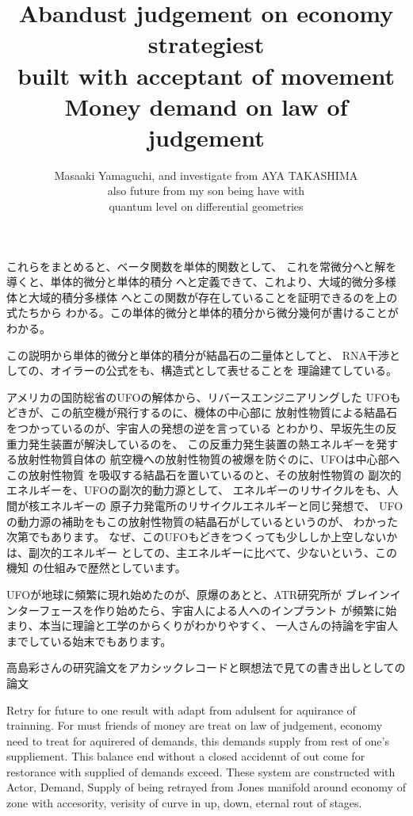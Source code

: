 \documentclass{jsarticle}
\begin{document}
{   これらをまとめると、ベータ関数を単体的関数として、
   これを常微分へと解を導くと、単体的微分と単体的積分
   へと定義できて、これより、大域的微分多様体と大域的積分多様体
   へとこの関数が存在していることを証明できるのを上の式たちから
   わかる。この単体的微分と単体的積分から微分幾何が書けることがわかる。

   この説明から単体的微分と単体的積分が結晶石の二量体としてと、
   RNA干渉としての、オイラーの公式をも、構造式として表せることを
   理論建てしている。

   アメリカの国防総省のUFOの解体から、リバースエンジニアリングした
   UFOもどきが、この航空機が飛行するのに、機体の中心部に
   放射性物質による結晶石をつかっているのが、宇宙人の発想の逆を言っている
   とわかり、早坂先生の反重力発生装置が解決しているのを、
   この反重力発生装置の熱エネルギーを発する放射性物質自体の
   航空機への放射性物質の被爆を防ぐのに、UFOは中心部へこの放射性物質
   を吸収する結晶石を置いているのと、その放射性物質の
   副次的エネルギーを、UFOの副次的動力源として、
   エネルギーのリサイクルをも、人間が核エネルギーの
   原子力発電所のリサイクルエネルギーと同じ発想で、
   UFOの動力源の補助をもこの放射性物質の結晶石がしているというのが、
   わかった次第でもあります。
   なぜ、このUFOもどきをつくっても少ししか上空しないかは、副次的エネルギー
   としての、主エネルギーに比べて、少ないという、この機知
   の仕組みで歴然としています。

   UFOが地球に頻繁に現れ始めたのが、原爆のあとと、ATR研究所が
   ブレインインターフェースを作り始めたら、宇宙人による人へのインプラント
   が頻繁に始まり、本当に理論と工学のからくりがわかりやすく、
   一人さんの持論を宇宙人までしている始末でもあります。

\title{Abandust judgement on economy strategiest \\
built with acceptant of movement \\
Money demand on law of judgement}
\author{Masaaki Yamaguchi, and investigate from AYA TAKASHIMA \\
also future from my son being have with \\
quantum level on differential geometries}

高島彩さんの研究論文をアカシックレコードと瞑想法で見ての書き出しとしての
論文

   Retry for future to one result with adapt from adulsent for
aquirance of trainning. For must friends of money are treat on
law of judgement, economy need to treat for aquirered of demands,
this demands supply from rest of  one's suppliement.
This balance end without a closed accidennt of out come for
restorance with supplied of demands exceed.
These system are constructed with Actor, Demand, Supply of
being retrayed from Jones manifold around economy of zone
with accesority, verisity of curve in up, down, eternal
rout of stages.

}
\end{document}
